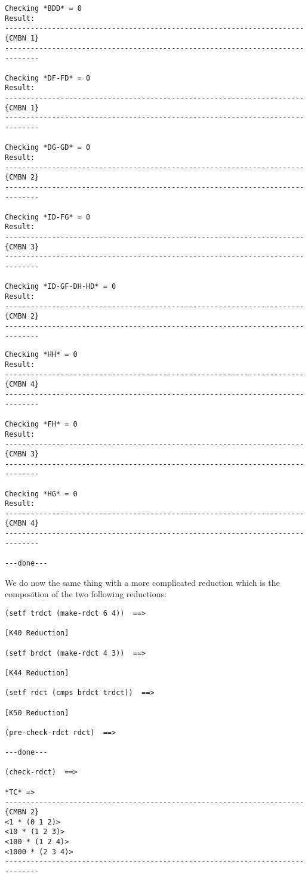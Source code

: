 {\begin{verbatim}
Checking *BDD* = 0
Result:
----------------------------------------------------------------------{CMBN 1}
------------------------------------------------------------------------------

Checking *DF-FD* = 0
Result:
----------------------------------------------------------------------{CMBN 1}
------------------------------------------------------------------------------

Checking *DG-GD* = 0
Result:
----------------------------------------------------------------------{CMBN 2}
------------------------------------------------------------------------------

Checking *ID-FG* = 0
Result:
----------------------------------------------------------------------{CMBN 3}
------------------------------------------------------------------------------

Checking *ID-GF-DH-HD* = 0
Result:
----------------------------------------------------------------------{CMBN 2}
------------------------------------------------------------------------------
\end{verbatim}}
\newpage
{\footnotesize\begin{verbatim}
Checking *HH* = 0
Result:
----------------------------------------------------------------------{CMBN 4}
------------------------------------------------------------------------------

Checking *FH* = 0
Result:
----------------------------------------------------------------------{CMBN 3}
------------------------------------------------------------------------------

Checking *HG* = 0
Result:
----------------------------------------------------------------------{CMBN 4}
------------------------------------------------------------------------------

---done---
\end{verbatim}}
We do now the same thing with a more complicated reduction which is the
composition of the two following reductions:
{\footnotesize\begin{verbatim}
(setf trdct (make-rdct 6 4))  ==>

[K40 Reduction]

(setf brdct (make-rdct 4 3))  ==>

[K44 Reduction]

(setf rdct (cmps brdct trdct))  ==>

[K50 Reduction]

(pre-check-rdct rdct)  ==>

---done---

(check-rdct)  ==>

*TC* =>
----------------------------------------------------------------------{CMBN 2}
<1 * (0 1 2)>
<10 * (1 2 3)>
<100 * (1 2 4)>
<1000 * (2 3 4)>
------------------------------------------------------------------------------
\end{verbatim}}
